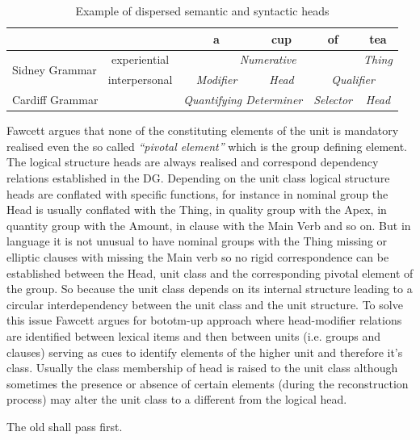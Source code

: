 \begin{table}[h]
	\centering
	\begin{tabular}{|c|c|c|c|c|c|}
		\hline
		\multicolumn{2}{|c|}{} & \textbf{a} & \textbf{cup} & \textbf{of} & \textbf{tea} \\ \hline
		\multirow{2}{*}{Sidney Grammar} & experiential & \multicolumn{3}{c|}{\textit{Numerative}} & \textit{Thing} \\ \cline{2-6} 
		& interpersonal & \textit{Modifier} & \textit{Head} & \multicolumn{2}{c|}{\textit{Qualifier}} \\ \hline
		\multicolumn{2}{|l|}{Cardiff Grammar} & \multicolumn{2}{c|}{\textit{Quantifying Determiner}} & \textit{Selector} & \textit{Head} \\ \hline
	\end{tabular}
	\caption{Example of dispersed semantic and syntactic heads}
	\label{tab:the-head-differences}
\end{table}

Fawcett argues that none of the constituting elements of the unit is mandatory realised even the so called \textit{``pivotal element''} which is the group defining element. The logical structure heads are always realised and correspond dependency relations established in the DG. Depending on the unit class logical structure heads are conflated with specific functions, for instance in nominal group the Head is usually conflated with the Thing, in quality group with the Apex, in quantity group with the Amount, in clause with the Main Verb and so on. But in language it is not unusual to have nominal groups with the Thing missing or elliptic clauses with missing the Main verb so no rigid correspondence can be established between the Head, unit class and the corresponding pivotal element of the group. So because the unit class depends on its internal structure leading to a circular interdependency between the unit class and the unit structure. To solve this issue Fawcett argues for bototm-up approach where head-modifier relations are identified between lexical items and then between units (i.e. groups and clauses) serving as cues to identify elements of the higher unit and therefore it's class. Usually the class membership of head is raised to the unit class although sometimes the presence or absence of certain elements (during the reconstruction process) may alter the unit class to a different from the logical head. 

\begin{exe}
	\ex\label{ex:the-old-example} The old shall pass first.
\end{exe}

